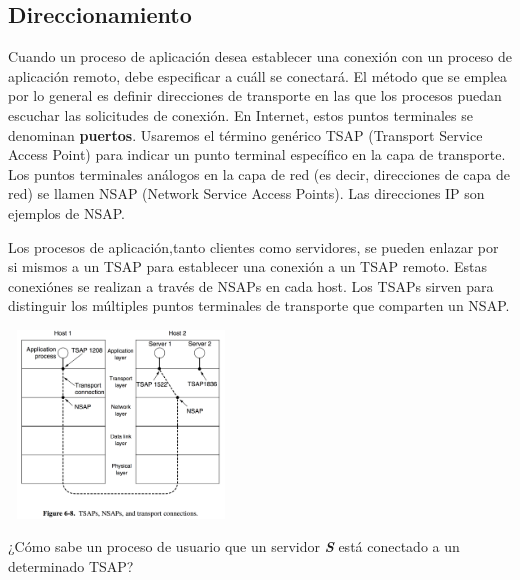 \documentclass[10pt,a4paper]{report}
\begin{document}
\subsection{Direccionamiento}
\par Cuando un proceso de aplicación desea establecer una conexión con un proceso 
de aplicación remoto, debe especificar a cuáll se conectará. El método que se emplea 
por lo general es definir direcciones de transporte en las que los procesos puedan 
escuchar las solicitudes de conexión. En Internet, estos puntos terminales se 
denominan \textbf{puertos}. Usaremos el término genérico TSAP (Transport Service 
Access Point) para indicar un punto terminal específico en la capa de transporte. Los 
puntos terminales análogos en la capa de red (es decir, direcciones de capa de red) se 
llamen NSAP (Network Service Access Points). Las direcciones IP son ejemplos de 
NSAP.
\par Los procesos de aplicación,tanto clientes como servidores, se pueden enlazar por 
si mismos a un TSAP para establecer una conexión a un TSAP remoto. Estas 
conexiónes se realizan a través de NSAPs en cada host. Los TSAPs sirven para 
distinguir los múltiples puntos terminales de transporte que comparten un NSAP.

\begin{center}
	\includegraphics[width=6cm, height=5cm]{./imagenes/tsap.png} 
\end{center}

\par ¿Cómo sabe un proceso de usuario que un servidor \textbf{\textit{S}} está 
conectado a un determinado TSAP?
\end{document}
